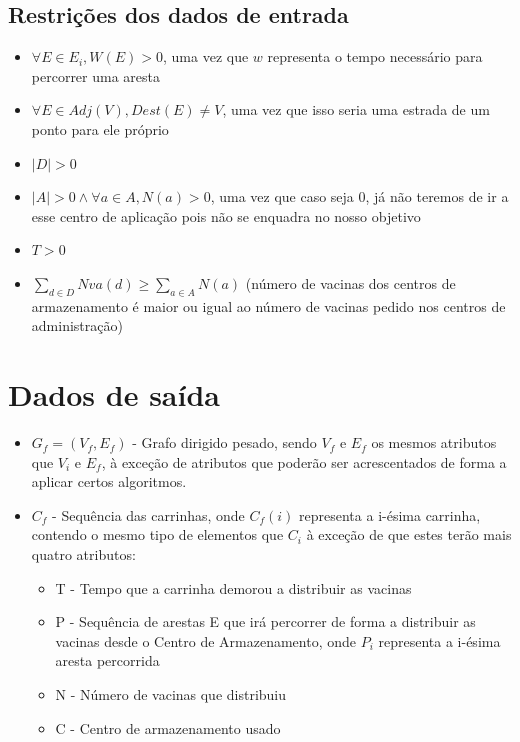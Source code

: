 \documentclass[12pt,a4paper]{report}
\begin{document}
		\subsection{Restrições dos dados de entrada}
		\begin{itemize}
			\item \( \forall E \in E_i, W(E) > 0 \), uma vez que \( w \) representa o tempo necessário para percorrer uma aresta
			\item \( \forall E \in Adj(V), Dest(E) \neq V \), uma vez que isso seria uma estrada de um ponto para ele próprio
			\item \( |D| > 0 \)
			\item \(|A| > 0 \land \forall a \in A, N(a) > 0 \), uma vez que caso seja 0, já não teremos de ir a esse centro de aplicação pois não se enquadra no nosso objetivo
			\item \(T > 0\)
			\item \(\sum_{d \in D} Nva(d) \geq \sum_{a \in A} N(a) \) (número de vacinas dos centros de armazenamento é maior ou igual ao número de vacinas pedido nos centros de administração)
		\end{itemize}


	\section{Dados de saída}
	\begin{itemize}
		\item \( G_f = (V_f, E_f) \) - Grafo dirigido pesado, sendo \( V_f \) e \( E_f \) os mesmos atributos que \( V_i \) e \( E_f \), à exceção de atributos que poderão ser acrescentados de forma a aplicar certos algoritmos.
		\item \(C_f\) - Sequência das carrinhas, onde \( C_f(i) \) representa a i-ésima carrinha, contendo o mesmo tipo de elementos que \( C_i \) à exceção de que estes terão mais quatro atributos:
		\begin{itemize}
			\item T - Tempo que a carrinha demorou a distribuir as vacinas
			\item P - Sequência de arestas E que irá percorrer de forma a distribuir as vacinas desde o Centro de Armazenamento, onde \( P_i \) representa a i-ésima aresta percorrida
			\item N - Número de vacinas que distribuiu
			\item C - Centro de armazenamento usado
		\end{itemize}
	\end{itemize}
\end{document}
